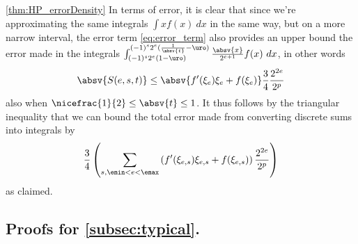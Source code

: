 \begin{myproof}{\cref{thm:HP_errorDensity}}
In terms of error, it is clear that since we're approximating the same integrals $\int xf(x)~dx$ in the same way, but on a more narrow interval, the error term \cref{eq:error_term} also provides an upper bound the error made in the integrals $\int_{(-1)^s2^e(1-\uro)}^{(-1)^s2^e(\frac{1}{\absv{t}}-\uro)}\frac{\absv{x}}{2^{e+1}} f(x) ~dx$,  in other words 
\[
\absv{S(e,s,t)}\leq  \absv{f'(\xi_e)\xi_e + f(\xi_e)} \frac{3}{4}\frac{2^{2e}}{2^{p}}
\]
also when $\nicefrac{1}{2}\leq \absv{t}\leq 1$. It thus follows by the triangular inequality that we can bound the total error made from converting discrete sums into integrals by
\[
\frac{3}{4} \left(\sum_{s, \emin<e<\emax} \left(f'(\xi_{e,s})\xi_{e,s} + f(\xi_{e,s})\right)\frac{2^{2e}}{2^{p}}\right)
\]
as claimed.
\end{myproof}


\subsection*{Proofs for \cref{subsec:typical}.}

